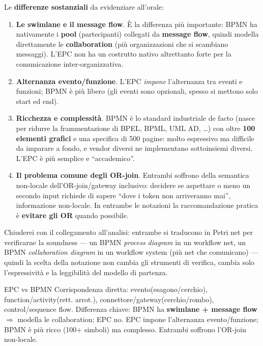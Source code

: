 Le \textbf{differenze sostanziali} da evidenziare all'orale:

\begin{enumerate}
  \item \textbf{Le swimlane e il message flow}. È la differenza più importante: BPMN ha nativamente i \textbf{pool} (partecipanti) collegati da \textbf{message flow}, quindi modella direttamente le \textbf{collaboration} (più organizzazioni che si scambiano messaggi). L'EPC non ha un costrutto nativo altrettanto forte per la comunicazione inter-organizzativa.
  \item \textbf{Alternanza evento/funzione}. L'EPC \emph{impone} l'alternanza tra eventi e funzioni; BPMN è più libero (gli eventi sono opzionali, spesso si mettono solo start ed end).
  \item \textbf{Ricchezza e complessità}. BPMN è lo standard industriale de facto (nasce per ridurre la frammentazione di BPEL, BPML, UML AD, \dots) con oltre \textbf{100 elementi grafici} e una specifica di 500 pagine: molto espressivo ma difficile da imparare a fondo, e vendor diversi ne implementano sottoinsiemi diversi. L'EPC è più semplice e ``accademico''.
  \item \textbf{Il problema comune degli OR-join}. Entrambi soffrono della semantica non-locale dell'OR-join/gateway inclusivo: decidere se aspettare o meno un secondo input richiede di sapere ``dove i token non arriveranno mai'', informazione non-locale. In entrambe le notazioni la raccomandazione pratica è \textbf{evitare gli OR} quando possibile.
\end{enumerate}

Chiuderei con il collegamento all'analisi: entrambe si traducono in Petri net per verificarne la soundness — un BPMN \emph{process diagram} in un workflow net, un BPMN \emph{collaboration diagram} in un workflow system (più net che comunicano) — quindi la scelta della notazione non cambia gli strumenti di verifica, cambia solo l'espressività e la leggibilità del modello di partenza.

\begin{puntochiave}{EPC vs BPMN}
Corrispondenza diretta: evento(esagono/cerchio), function/activity(rett. arrot.), connettore/gateway(cerchio/rombo), control/sequence flow. Differenza chiave: BPMN ha \textbf{swimlane + message flow} $\Rightarrow$ modella le collaboration; EPC no. EPC impone l'alternanza evento/funzione; BPMN è più ricco (100+ simboli) ma complesso. Entrambi soffrono l'OR-join non-locale.
\end{puntochiave}
